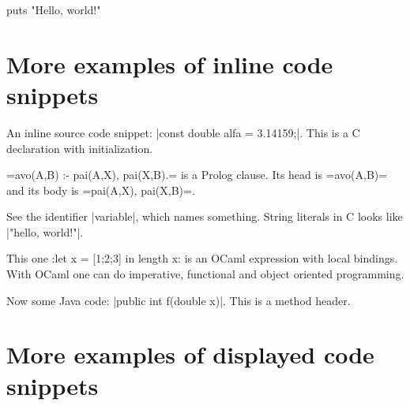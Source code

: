 \documentclass[10pt,a4paper]{article}
\begin{document}
\begin{Example}
\begin{pygmented}[lang=tcl]
puts "Hello, world!"
\end{pygmented}
\end{Example}

\section{More examples of inline code snippets}

\begin{Example}
  An inline source code snippet:
  \pyginline[lang=c]|const double alfa = 3.14159;|.
  This is a C declaration with initialization.
\end{Example}

\begin{Example}
  \pyginline[lang=prolog,colback=yellow]=avo(A,B) :- pai(A,X), pai(X,B).=
  is a Prolog clause. Its head is
  \pyginline[lang=prolog,sty=emacs,colback=yellow,linecolor=red]=avo(A,B)=
  and its body is
  \pyginline[lang=prolog,sty=vim,colback=black,hidealllines]=pai(A,X), pai(X,B)=.
\end{Example}

\begin{Example}
  See the identifier \pyginline[inline method=efbox,colback=green!25]|variable|,
  which names something. String literals in C looks like
  \pyginline[lang=c,inline method=tcbox,colback=blue!20,boxrule=2pt]|"hello, world!\n"|.
\end{Example}


\begin{Example}
  This one
  \pyginline[lang=ocaml,font=\ttfamily\scriptsize,topline=false]:let x = [1;2;3] in length x:
  is an OCaml expression with local bindings. With OCaml one can do
  imperative, functional and object oriented programming.
\end{Example}

\begin{Example}
  Now some Java code:
  \pyginline[lang=java,sty=colorful,font=\ttfamily\itshape,linewidth=1pt]|public int f(double x)|.
  This is a method header.
\end{Example}

\section{More examples of displayed code snippets}
\end{document}

